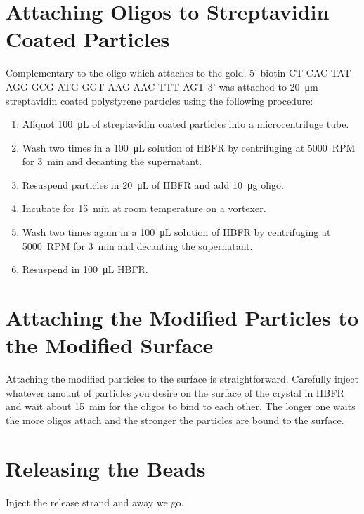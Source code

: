 \documentclass[a4paper]{article}
\begin{document}
\section{Attaching Oligos to Streptavidin Coated Particles}
Complementary to the oligo which attaches to the gold,
5'-biotin-CT CAC TAT AGG GCG ATG GGT AAG AAC TTT AGT-3' was attached to
\SI{20}{\micro\meter} streptavidin coated polystyrene particles using the
following procedure:
\begin{enumerate}
 \item Aliquot \SI{100}{\micro\liter} of streptavidin coated particles into
  a microcentrifuge tube.
 \item Wash two times in a \SI{100}{\micro\liter} solution of HBFR by
  centrifuging at \SI{5000}{RPM} for \SI{3}{\minute} and decanting the
  supernatant.
 \item Resuspend particles in \SI{20}{\micro\liter} of HBFR and add
  \SI{10}{\micro\gram} oligo.
 \item Incubate for \SI{15}{\minute} at room temperature on a vortexer.
 \item Wash two times again in a \SI{100}{\micro\liter} solution of HBFR by
  centrifuging at \SI{5000}{RPM} for \SI{3}{\minute} and decanting the
  supernatant.
 \item Resuspend in \SI{100}{\micro\liter} HBFR.
\end{enumerate}

\section{Attaching the Modified Particles to the Modified Surface}
Attaching the modified particles to the surface is straightforward.
Carefully inject whatever amount of particles you desire on the surface of
the crystal in HBFR and wait about \SI{15}{\minute} for the oligos to bind
to each other.  The longer one waits the more oligos attach and the
stronger the particles are bound to the surface.

\section{Releasing the Beads}
Inject the release strand and away we go.
\end{document}
